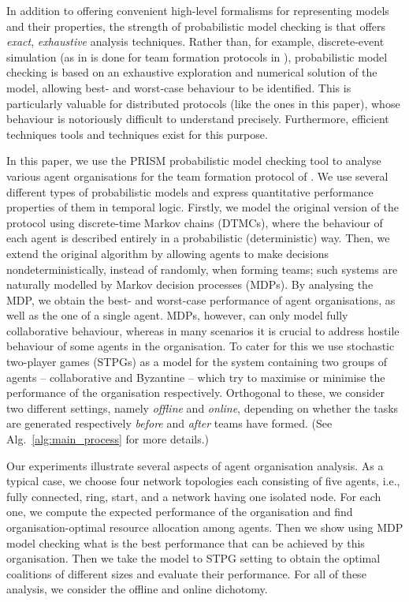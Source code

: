 \documentclass{llncs}
\newcommand{\dave}[1]{\marginpar{\footnotesize \color{red} {\bf D:} \textsf{#1}}}
\begin{document}
In addition to offering convenient high-level formalisms for representing models and their properties,
the strength of probabilistic model checking is that offers \emph{exact}, \emph{exhaustive} analysis techniques.
Rather than, for example, discrete-event simulation
(as in is done for team formation protocols in \cite{gaston2005agent}),
probabilistic model checking is based on an exhaustive exploration and numerical solution of the model,
allowing best- and worst-case behaviour to be identified.
This is particularly valuable for distributed protocols (like the ones in this paper),
whose behaviour is notoriously difficult to understand precisely. %
Furthermore, efficient techniques tools and techniques exist for this purpose.

In this paper, we use the PRISM probabilistic model checking tool \cite{KNP11} to analyse various agent organisations for the team formation protocol of \cite{gaston2005agent}.
We use several different types of probabilistic models
and express quantitative performance properties of them in temporal logic.
Firstly, we model the original version of the protocol using discrete-time Markov chains (DTMCs), where the behaviour of each agent is described entirely in a probabilistic (deterministic) way. Then, we extend the original algorithm  by allowing agents to make decisions nondeterministically, instead of randomly, when forming teams; such systems are naturally modelled by Markov decision processes (MDPs). By analysing the MDP, we obtain the best- and worst-case performance of agent organisations, as well as the one of a single agent.
MDPs, however, can only model fully collaborative behaviour, whereas in many scenarios it is crucial to address hostile behaviour of some agents in the organisation. To cater for this we use stochastic two-player games (STPGs) as a model for the system containing two groups of agents -- collaborative and Byzantine -- which try to maximise or minimise the performance of the organisation respectively. Orthogonal to these, we consider two different settings, namely \emph{offline} and \emph{online}, depending on whether the tasks are generated respectively \emph{before} and \emph{after} teams have formed. (See Alg.~\ref{alg:main_process} for more details.)
 

Our experiments illustrate several aspects of agent organisation analysis. As a typical case, we choose four network topologies each consisting of five agents, i.e., fully connected, ring, start, and a network having one isolated node. For each one, we compute the expected performance of the organisation and find organisation-optimal resource allocation among agents. Then we show using MDP model checking what is the best performance that can be achieved by this organisation. Then we take the model to STPG setting to obtain the optimal coalitions of different sizes and evaluate their performance. For all of these analysis, we consider the offline and online dichotomy. 
\end{document}
